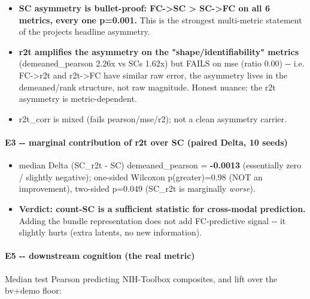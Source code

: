 \begin{itemize}
\tightlist
\item
  \textbf{SC asymmetry is bullet-proof: FC-\textgreater SC \textgreater{} SC-\textgreater FC on all 6 metrics, every one p=0.001.} This is the strongest multi-metric statement of the project\textquotesingle s headline asymmetry.
\item
  \textbf{r2t amplifies the asymmetry on the "shape/identifiability" metrics} (demeaned\_pearson 2.26x vs SC\textquotesingle s 1.62x) but FAILS on mse (ratio 0.00) -\/- i.e. FC-\textgreater r2t and r2t-\textgreater FC have similar raw error, the asymmetry lives in the demeaned/rank structure, not raw magnitude. Honest nuance: the r2t asymmetry is metric-dependent.
\item
  r2t\_corr is mixed (fails pearson/mse/r2); not a clean asymmetry carrier.
\end{itemize}

\paragraph{E3 -\/- marginal contribution of r2t over SC (paired Delta, 10 seeds)}\label{e3----marginal-contribution-of-r2t-over-sc-paired-delta-10-seeds}

\begin{itemize}
\tightlist
\item
  median Delta (SC\_r2t - SC) demeaned\_pearson = \textbf{-0.0013} (essentially zero / slightly negative); one-sided Wilcoxon p(greater)=0.98 (NOT an improvement), two-sided p=0.049 (SC\_r2t is marginally \emph{worse}).
\item
  \textbf{Verdict: count-SC is a sufficient statistic for cross-modal prediction.} Adding the bundle representation does not add FC-predictive signal -\/- it slightly hurts (extra latents, no new information).
\end{itemize}

\paragraph{E5 -\/- downstream cognition (the real metric)}\label{e5----downstream-cognition-the-real-metric}

Median test Pearson predicting NIH-Toolbox composites, and lift over the bv+demo floor:

